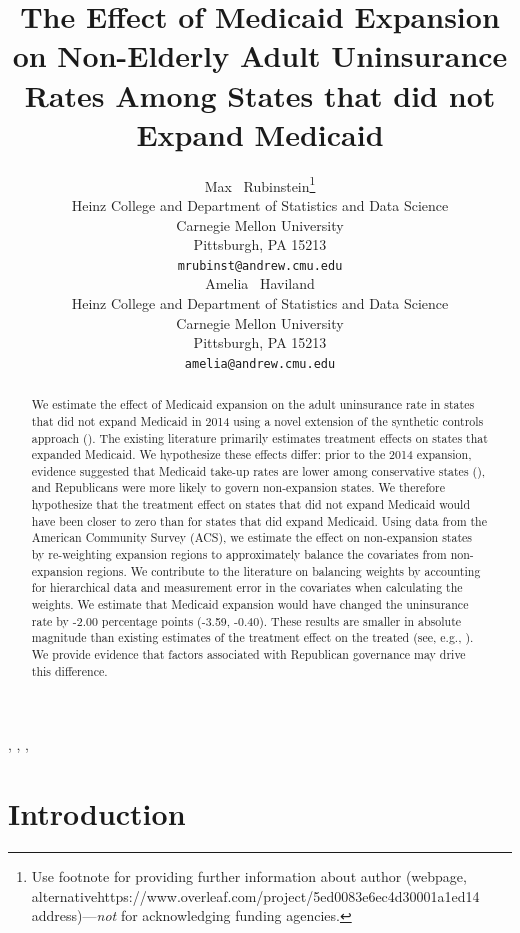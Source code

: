 \documentclass{article}
\title{The Effect of Medicaid Expansion on Non-Elderly Adult Uninsurance Rates Among States that did not Expand Medicaid}
\author{
  Max ~Rubinstein\thanks{Use footnote for providing further
    information about author (webpage, alternativehttps://www.overleaf.com/project/5ed0083e6ec4d30001a1ed14
    address)---\emph{not} for acknowledging funding agencies.} \\
  Heinz College and Department of Statistics and Data Science\\
  Carnegie Mellon University\\
  Pittsburgh, PA 15213 \\
  \texttt{mrubinst@andrew.cmu.edu} \\
   \And
 Amelia ~Haviland \\
  Heinz College and Department of Statistics and Data Science\\
  Carnegie Mellon University\\
  Pittsburgh, PA 15213 \\
  \texttt{amelia@andrew.cmu.edu} \\
}
\begin{document}
\maketitle

\begin{abstract}
We estimate the effect of Medicaid expansion on the adult uninsurance rate in states that did not expand Medicaid in 2014 using a novel extension of the synthetic controls approach (\cite{abadie2010synthetic}). The existing literature primarily estimates treatment effects on states that expanded Medicaid. We hypothesize these effects differ: prior to the 2014 expansion, evidence suggested that Medicaid take-up rates are lower among conservative states (\cite{sommers2012understanding}), and Republicans were more likely to govern non-expansion states. We therefore hypothesize that the treatment effect on states that did not expand Medicaid would have been closer to zero than for states that did expand Medicaid. Using data from the American Community Survey (ACS), we estimate the effect on non-expansion states by re-weighting expansion regions to approximately balance the covariates from non-expansion regions. We contribute to the literature on balancing weights by accounting for hierarchical data and measurement error in the covariates when calculating the weights. We estimate that Medicaid expansion would have changed the uninsurance rate by -2.00 percentage points (-3.59, -0.40). These results are smaller in absolute magnitude than existing estimates of the treatment effect on the treated (see, e.g., \cite{courtemanche2017early}). We provide evidence that factors associated with Republican governance may drive this difference.
\end{abstract}

\begin{keyword}
,
,
,
\end{keyword}



\section{Introduction}
\end{document}
